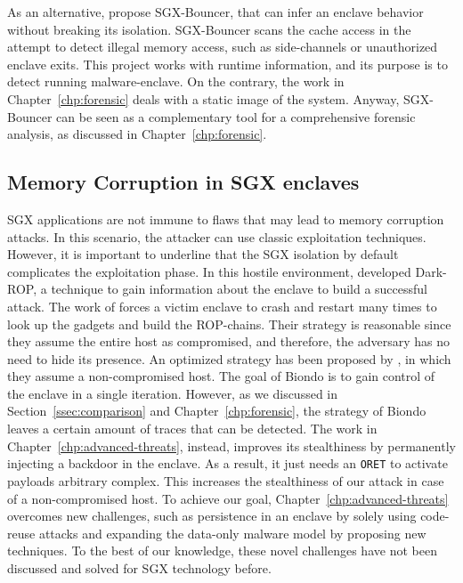As an alternative, \cite{zhang2021see} propose SGX-Bouncer, that can infer an 
enclave behavior without breaking its isolation.
SGX-Bouncer scans the cache access in the attempt to detect illegal memory
access, such as side-channels or unauthorized enclave exits.
This project works with runtime information, and its purpose is to detect
running malware-enclave.
On the contrary, the work in Chapter~\ref{chp:forensic} deals with a static 
image of the system. 
Anyway, SGX-Bouncer can be seen as a complementary tool for a comprehensive
forensic analysis, as discussed in Chapter~\ref{chp:forensic}.


\subsection{Memory Corruption in SGX enclaves}
\label{ssec:memory-corrution}

SGX applications are not immune to flaws that may lead to memory corruption 
attacks.
In this scenario, the attacker can use classic exploitation techniques.
However, it is important to underline that the SGX isolation by default 
complicates the exploitation phase.
In this hostile environment, \cite{lee2017hacking} developed 
Dark-ROP, a technique to gain information about the enclave to build a 
successful attack.
The work of \cite{lee2017hacking} forces a victim enclave to crash
and restart many times to look up the gadgets and build the ROP-chains.
Their strategy is reasonable since they assume the entire host as compromised,
and therefore, the adversary has no need to hide its presence.
An optimized strategy has been proposed by \cite{biondo2018guard}, in which 
they assume a non-compromised host. 
The goal of Biondo is to gain control of the enclave in a single 
iteration.
However, as we discussed in Section~\ref{ssec:comparison} and 
Chapter~\ref{chp:forensic}, the strategy of Biondo leaves a certain amount of 
traces that can be detected.
The work in Chapter~\ref{chp:advanced-threats}, instead, improves its 
stealthiness by permanently injecting a backdoor in the enclave.
As a result, it just needs an \texttt{ORET} to activate payloads 
arbitrary complex.
This increases the stealthiness of our attack in case of a non-compromised 
host.
To achieve our goal, Chapter~\ref{chp:advanced-threats} overcomes new 
challenges, such as persistence in an enclave by solely using code-reuse 
attacks and expanding the data-only malware model by proposing new techniques.
To the best of our knowledge, these novel challenges have not been 
discussed and solved for SGX technology before.

